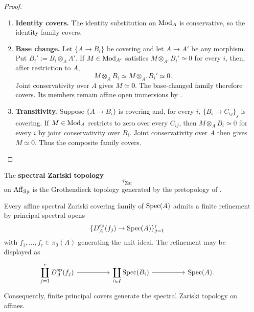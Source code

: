 \begin{proof}
\leavevmode
\begin{enumerate}[label=\textup{(\arabic*)}]
    \item \textbf{Identity covers.}
    The identity substitution on \(\operatorname{Mod}_A\) is conservative, so the identity
    family covers.

    \item \textbf{Base change.}
    Let \(\{A\to B_i\}\) be covering and let \(A\to A'\) be any morphism.
    Put \(B_i':=B_i\otimes_AA'\). If \(M\in\operatorname{Mod}_{A'}\) satisfies
    \(M\otimes_{A'}B_i'\simeq0\) for every \(i\), then, after restriction to
    \(A\),
    \[
        M\otimes_AB_i
        \simeq
        M\otimes_{A'}B_i'
        \simeq0.
    \]
    Joint conservativity over \(A\) gives \(M\simeq0\). The base-changed
    family therefore covers. Its members remain affine open immersions by
    .

    \item \textbf{Transitivity.}
    Suppose \(\{A\to B_i\}\) is covering and, for every \(i\),
    \(\{B_i\to C_{ij}\}_j\) is covering. If \(M\in\operatorname{Mod}_A\) restricts to
    zero over every \(C_{ij}\), then \(M\otimes_AB_i\simeq0\) for every
    \(i\) by joint conservativity over \(B_i\). Joint conservativity over
    \(A\) then gives \(M\simeq0\). Thus the composite family covers.
\end{enumerate}
\end{proof}

\begin{definition}
\label{def:spectral-zariski-topology}
The \textbf{spectral Zariski topology}
\[
    \tau_{\mathrm{Zar}}
\]
on \(\operatorname{Aff}_{\operatorname{Sp}}\) is the Grothendieck topology generated by the pretopology
of .
\end{definition}

\begin{proposition}
\label{prop:finite-principal-refinement}
Every affine spectral Zariski covering family of \(\operatorname{Spec}(A)\) admits a finite
refinement by principal spectral opens
\[
    \{D_A^{\mathrm{sp}}(f_j)\to\operatorname{Spec}(A)\}_{j=1}^r
\]
with \(f_1,\ldots,f_r\in\pi_0(A)\) generating the unit ideal. The
refinement may be displayed as
\[
\begin{tikzcd}[column sep=huge]
    \displaystyle\coprod_{j=1}^r D_A^{\mathrm{sp}}(f_j)
        \arrow[r]
    &
    \displaystyle\coprod_{i\in I}\Spec(B_i)
        \arrow[r]
    &
    \Spec(A).
\end{tikzcd}
\]
Consequently, finite principal covers generate the spectral Zariski topology
on affines.
\end{proposition}


